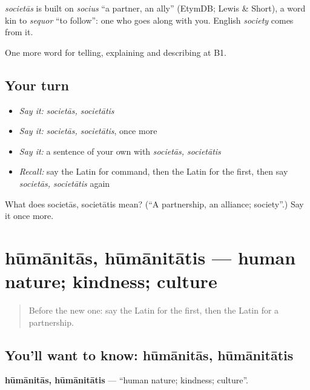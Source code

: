 \begin{cousinweb}
\emph{societās} is built on \emph{socius} \textquotedblleft{}a partner, an ally\textquotedblright{} (EtymDB; Lewis \& Short), a word kin to \emph{sequor} \textquotedblleft{}to follow\textquotedblright{}: one who goes along with you. English \emph{society} comes from it.
\end{cousinweb}

\begin{grammarlens}[title={What you've built}]
One more word for telling, explaining and describing at B1.
\end{grammarlens}

\subsection*{Your turn}
\begin{itemize}
\raggedright
  \item \emph{Say it:} \emph{societās, societātis}
  \item \emph{Say it:} \emph{societās, societātis}, once more
  \item \emph{Say it:} a sentence of your own with \emph{societās, societātis}
  \item \emph{Recall:} say the Latin for command, then the Latin for the first, then say \emph{societās, societātis} again
\end{itemize}

\begin{tcolorbox}[breakable,colback=teal!4,colframe=teal!35!black,title={Before you move on}]
What does societās, societātis mean? (\textquotedblleft{}A partnership, an alliance; society\textquotedblright{}.) Say it once more.
\end{tcolorbox}
\section[hūmānitās, hūmānitātis]{hūmānitās, hūmānitātis — human nature; kindness; culture}

\label{lesson:LA-C386-humanitas}



\begin{quote}
Before the new one: say the Latin for the first, then the Latin for a partnership.
\end{quote}

\subsection*{You'll want to know: hūmānitās, hūmānitātis}
\textbf{hūmānitās, hūmānitātis} — \textquotedblleft{}human nature; kindness; culture\textquotedblright{}.

